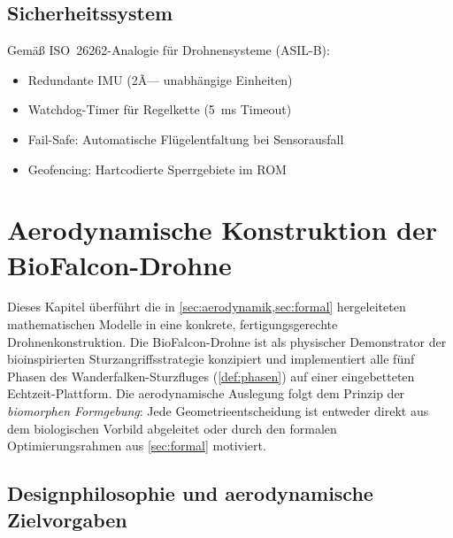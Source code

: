 ﻿\documentclass[12pt,a4paper]{article}
\theoremstyle{remark}
\begin{document}
	\subsection{Sicherheitssystem}
	
	Gemäß ISO~26262-Analogie für Drohnensysteme (ASIL-B):
	\begin{itemize}
		\item Redundante IMU (2Ã— unabhängige Einheiten)
		\item Watchdog-Timer für Regelkette (\SI{5}{\ms} Timeout)
		\item Fail-Safe: Automatische Flügelentfaltung bei Sensorausfall
		\item Geofencing: Hartcodierte Sperrgebiete im ROM
	\end{itemize}
	
	\section{Aerodynamische Konstruktion der BioFalcon-Drohne}
	\label{sec:konstruktion}
	
	Dieses Kapitel überführt die in \cref{sec:aerodynamik,sec:formal} hergeleiteten
	mathematischen Modelle in eine konkrete, fertigungsgerechte Drohnenkonstruktion.
	Die BioFalcon-Drohne ist als physischer Demonstrator der bioinspirierten
	Sturzangriffsstrategie konzipiert und implementiert alle fünf Phasen des
	Wanderfalken-Sturzfluges (\cref{def:phasen}) auf einer eingebetteten
	Echtzeit-Plattform.  Die aerodynamische Auslegung folgt dem Prinzip der
	\emph{biomorphen Formgebung}: Jede Geometrieentscheidung ist entweder direkt aus
	dem biologischen Vorbild abgeleitet oder durch den formalen Optimierungsrahmen
	aus \cref{sec:formal} motiviert.
	
	\subsection{Designphilosophie und aerodynamische Zielvorgaben}
	\label{sec:kons_ziele}
	
\end{document}
